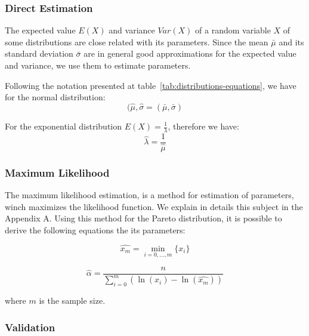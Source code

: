 \subsubsection{Direct Estimation}

The expected value $E(X)$ and variance $Var(X)$ of a random variable $X$ of some distributions are close related with its parameters. Since the mean $\bar{\mu}$ and its standard deviation $\bar{\sigma}$ are in general good approximations for the expected value and variance, we use them to estimate parameters.

Following the notation presented at table~\ref{tab:distributions-equations}, we have for the normal distribution:
\begin{equation}
(\hat{\mu}, \hat{\sigma} = (\bar{\mu}, \bar{\sigma})
\end{equation}

For the exponential distribution $E(X) = \frac{1}{\lambda}$, therefore we have:
\begin{equation}
\hat{\lambda} = \frac{1}{\hat{\mu}}
\end{equation} 

\subsubsection{Maximum Likelihood}

The maximum likelihood estimation, is a method for estimation of parameters, winch maximizes the likelihood function. We explain in details this subject in the Appendix A. Using this method for the Pareto distribution, it is possible to derive the following equations the its parameters:

\begin{equation}
\hat{x_{m}} = \min_{i = 0, ..., m}\{x_{i}\}
\end{equation} 

\begin{equation}
\hat{\alpha} = \frac{n}{ \sum_{i = 0}^{m}(\ln{(x_{i}) - \ln(\hat{x_{m}})})  }
\end{equation} 

where $m$ is the sample size.




\subsubsection{Validation}

